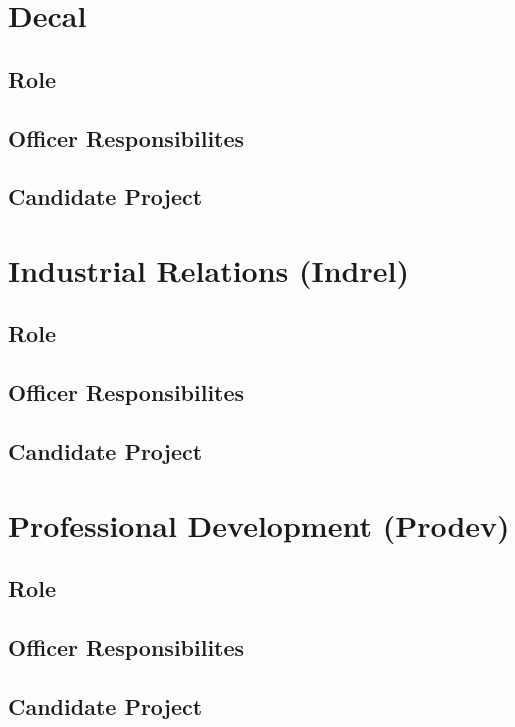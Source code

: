 \documentclass[11pt, article, oneside]{memoir}
\begin{document}
    \section{Decal}
    \subsection{Role}

    \subsection{Officer Responsibilites}

    \subsection{Candidate Project}

    \bigbreak

    
    \section{Industrial Relations (Indrel)}
    \subsection{Role}

    \subsection{Officer Responsibilites}

    \subsection{Candidate Project}

    \bigbreak

    
    \section{Professional Development (Prodev)}
    \subsection{Role}

    \subsection{Officer Responsibilites}

    \subsection{Candidate Project}
\end{document}
